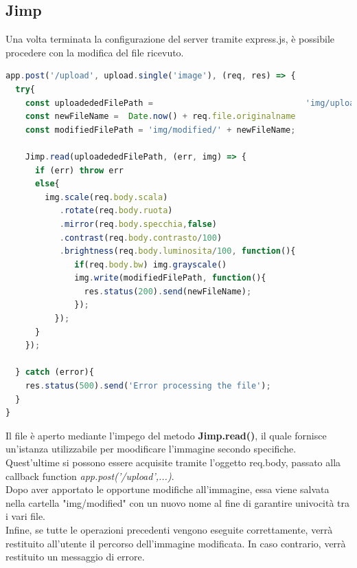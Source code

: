 \subsection{Jimp}
Una volta terminata la configurazione del server tramite express.js, è possibile procedere con la modifica del file ricevuto. 
\begin{lstlisting}[language=Javascript,caption={Elaborazione immagine grazie ai metodi della libreria Jimp}, showstringspaces=false]
app.post('/upload', upload.single('image'), (req, res) => {
  try{
    const uploadededFilePath =                               'img/uploaded/' + req.file.originalname
    const newFileName =  Date.now() + req.file.originalname 
    const modifiedFilePath = 'img/modified/' + newFileName;

    Jimp.read(uploadededFilePath, (err, img) => {
      if (err) throw err
      else{
        img.scale(req.body.scala)
           .rotate(req.body.ruota)
           .mirror(req.body.specchia,false)
           .contrast(req.body.contrasto/100)
           .brightness(req.body.luminosita/100, function(){
              if(req.body.bw) img.grayscale()
              img.write(modifiedFilePath, function(){
                res.status(200).send(newFileName);
              });
          });
      }
    });

  } catch (error){
    res.status(500).send('Error processing the file');
  }
}
\end{lstlisting}
Il file è aperto mediante l'impego del metodo \textbf{Jimp.read()}, il quale fornisce un'istanza utilizzabile per moodificare l'immagine secondo specifiche.
Quest'ultime si possono essere acquisite  tramite l'oggetto req.body, passato alla callback function \emph{app.post('/upload',...)}.
\\Dopo aver apportato le opportune modifiche all'immagine, essa viene salvata nella cartella "img/modified" con un nuovo nome al fine di garantire univocità tra i vari file.
\\Infine, se tutte le operazioni precedenti vengono eseguite correttamente, verrà restituito all'utente il percorso dell'immagine modificata. In caso contrario, verrà restituito un messaggio di errore.
\newpage
